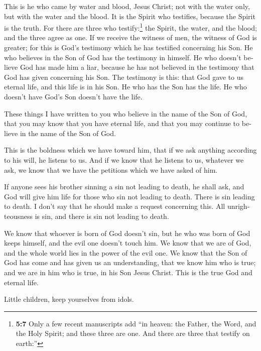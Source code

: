 \begin{paracol}{2}
\begin{otherlanguage}{english}
 This is he who came by water and blood, Jesus Christ; not
with the water only, but with the water and the blood. It is the Spirit
who testifies, because the Spirit is the truth.  For there
are three who testify:\footnote{\textbf{5:7} Only a few recent
  manuscripts add ``in heaven: the Father, the Word, and the Holy
  Spirit; and these three are one. And there are three that testify on
  earth:''}  the Spirit, the water, and the blood; and the
three agree as one.  If we receive the witness of men, the
witness of God is greater; for this is God's testimony which he has
testified concerning his Son.  He who believes in the Son
of God has the testimony in himself. He who doesn't believe God has made
him a liar, because he has not believed in the testimony that God has
given concerning his Son.  The testimony is this: that
God gave to us eternal life, and this life is in his Son.
 He who has the Son has the life. He who doesn't have
God's Son doesn't have the life.

 These things I have written to you who believe in the
name of the Son of God, that you may know that you have eternal life,
and that you may continue to believe in the name of the Son of God.

 This is the boldness which we have toward him, that if
we ask anything according to his will, he listens to us. 
And if we know that he listens to us, whatever we ask, we know that we
have the petitions which we have asked of him.

 If anyone sees his brother sinning a sin not leading to
death, he shall ask, and God will give him life for those who sin not
leading to death. There is sin leading to death. I don't say that he
should make a request concerning this.  All
unrighteousness is sin, and there is sin not leading to death.

 We know that whoever is born of God doesn't sin, but he
who was born of God keeps himself, and the evil one doesn't touch him.
 We know that we are of God, and the whole world lies in
the power of the evil one.  We know that the Son of God
has come and has given us an understanding, that we know him who is
true; and we are in him who is true, in his Son Jesus Christ. This is
the true God and eternal life.

 Little children, keep yourselves from idols.
\end{otherlanguage} \end{paracol}
